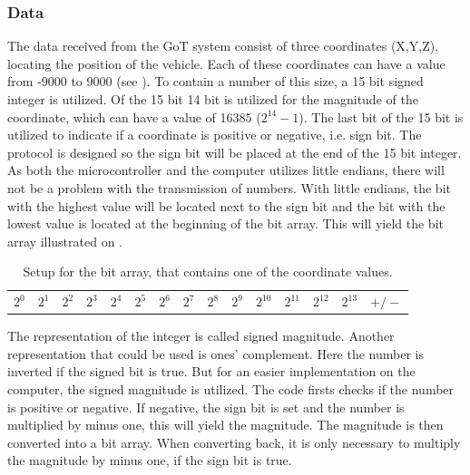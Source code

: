 \subsubsection{Data}
The data received from the GoT system consist of three coordinates (X,Y,Z), locating the position of the vehicle. Each of these coordinates can have a value from -9000 to 9000 (see ). To contain a number of this size, a 15 bit signed integer is utilized. Of the 15 bit 14 bit is utilized for the magnitude of the coordinate, which can have a value of 16385 ($2^{14}-1$). The last bit of the 15 bit is utilized to indicate if a coordinate is positive or negative, i.e. sign bit. The protocol is designed so the sign bit will be placed at the end of the 15 bit integer. As both the microcontroller and the computer utilizes little endians, there will not be a problem with the transmission of numbers. With little endians, the bit with the highest value will be located next to the sign bit and the bit with the lowest value is located at the beginning of the bit array. This will yield the bit array illustrated on .

\begin{table}[H]
\centering
\begin{tabular}{|>{\centering\arraybackslash}m{0.5cm}|>{\centering\arraybackslash}m{0.5cm}|>{\centering\arraybackslash}m{0.5cm}|>{\centering\arraybackslash}m{0.5cm}|>{\centering\arraybackslash}m{0.5cm}|>{\centering\arraybackslash}m{0.5cm}|>{\centering\arraybackslash}m{0.5cm}|>{\centering\arraybackslash}m{0.5cm}|>{\centering\arraybackslash}m{0.5cm}|>{\centering\arraybackslash}m{0.5cm}|>{\centering\arraybackslash}m{0.5cm}|>{\centering\arraybackslash}m{0.5cm}|>{\centering\arraybackslash}m{0.5cm}|>{\centering\arraybackslash}m{0.5cm}|>{\centering\arraybackslash}m{0.65cm}|}
\multicolumn{15}{c}{15 bits} \\
\hline
$2^0$ & $2^1$ & $2^2$ & $2^3$ & $2^4$ & $2^5$ & $2^6$ & $2^7$ & $2^8$ & $2^9$ & $2^{10}$ & $2^{11}$ & $2^{12}$ & $2^{13}$ & $+/-$ \\
\hline
\end{tabular}
\caption{Setup for the bit array, that contains one of the coordinate values.}
\label{CoorSetup}
\end{table}

The representation of the integer is called signed magnitude. Another representation that could be used is ones' complement. Here the number is inverted if the signed bit is true. But for an easier implementation on the computer, the signed magnitude is utilized. The code firsts checks if the number is positive or negative. If negative, the sign bit is set and the number is multiplied by minus one, this will yield the magnitude. The magnitude is then converted into a bit array. When converting back, it is only necessary to multiply the magnitude by minus one, if the sign bit is true.

